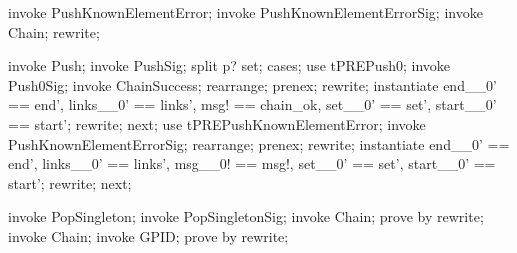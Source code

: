 \begin{forget}[tPREPushKnownElementError]
invoke PushKnownElementError;
invoke PushKnownElementErrorSig;
invoke \Xi Chain;
rewrite;
\end{forget}


\begin{forget}[tPREPushIsTotal]
invoke Push;
invoke PushSig;
split p? \notin  set;
cases;
use tPREPush0;
invoke Push0Sig;
invoke ChainSuccess;
rearrange;
prenex;
rewrite;
instantiate end\_\_0' == end',
    links\_\_0' == links',
    msg! == chain\_ok,
    set\_\_0' == set',
    start\_\_0' == start';
rewrite;
next;
use tPREPushKnownElementError;
invoke PushKnownElementErrorSig;
rearrange;
prenex;
rewrite;
instantiate end\_\_0' == end',
    links\_\_0' == links',
    msg\_\_0! == msg!,
    set\_\_0' == set',
    start\_\_0' == start';
rewrite;
next;
\end{forget}

\begin{forget}[tPREPopSingleton]
invoke PopSingleton;
invoke PopSingletonSig;
invoke \Delta Chain;
prove by rewrite;
invoke Chain;
invoke GPID;
prove by rewrite;
\end{forget}

